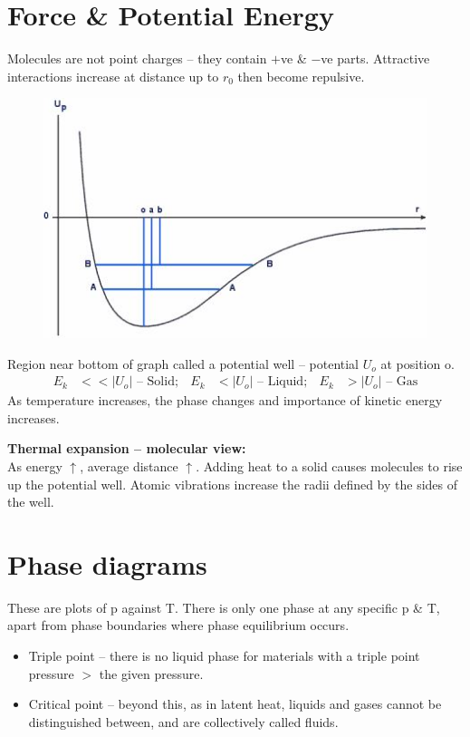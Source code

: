 \documentclass[a4paper, 11pt, normalem]{report}
\begin{document}
\section{Force \& Potential Energy}
Molecules are not point charges -- they contain $+$ve \& $-$ve parts.
Attractive interactions increase at distance up to $r_{0}$ then become repulsive.
\begin{figure}[H]
    \centering
    \includegraphics[scale=0.9]{PotWell.jpg}
\end{figure}
Region near bottom of graph called a potential well -- potential $U_{o}$ at position o.
\begin{align}
    E_{k} &<< |U_{o}| \text{ -- Solid}; &
    E_{k} &< |U_{o}| \text{ -- Liquid}; &
    E_{k} &> |U_{o}| \text{ -- Gas}
\end{align}
As temperature increases, the phase changes and importance of kinetic energy increases.

\textbf{Thermal expansion -- molecular view:}\\
As energy $\uparrow$, average distance $\uparrow$.
Adding heat to a solid causes molecules to rise up the potential well.
Atomic vibrations increase the radii defined by the sides of the well.

\section{Phase diagrams}
These are plots of p against T.
There is only one phase at any specific p \& T, apart from phase boundaries where phase equilibrium occurs.
\begin{itemize}
    \item Triple point -- there is no liquid phase for materials with a triple point pressure $>$ the given pressure.
    \item Critical point -- beyond this, as in latent heat, liquids and gases cannot be distinguished between, and are collectively called fluids.
\end{itemize}
\end{document}
